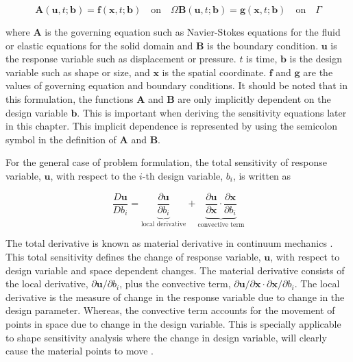 \begin{subequations}\label{eq:C2_governingEquationAndBC}
\begin{equation}\label{eq:C2_generalGoverningEquation}
	\mathbf{A}(\mathbf{u}, t; \mathbf{b}) = \mathbf{f}(\mathbf{x}, t; \mathbf{b})
	\quad \text{on} \quad \Omega
\end{equation}
\begin{equation}\label{eq:C2_generalBoundaryCondition}
	\mathbf{B}(\mathbf{u}, t; \mathbf{b}) = \mathbf{g}(\mathbf{x}, t; \mathbf{b})	
	\quad \text{on} \quad \Gamma
\end{equation}
\end{subequations}

where $\mathbf{A}$ is the governing equation such as Navier-Stokes equations for the fluid or elastic equations for the solid domain and $\mathbf{B}$ is the boundary condition. $\mathbf{u}$ is the response variable such as displacement or pressure. $t$ is time, $\mathbf{b}$ is the design variable such as shape or size, and $\mathbf{x}$ is the spatial coordinate. $\mathbf{f}$ and $\mathbf{g}$ are the values of governing equation and boundary conditions. It should be noted that in this formulation, the functions $\mathbf{A}$ and $\mathbf{B}$ are only implicitly dependent on the design variable $\mathbf{b}$. This is important when deriving the sensitivity equations later in this chapter. This implicit dependence is represented by using the semicolon symbol in the definition of $\mathbf{A}$ and $\mathbf{B}$.

For the general case of problem formulation, the total sensitivity of response variable, $\mathbf{u}$, with respect to the $i$-th design variable, $b_i$, is written as

\begin{equation}\label{eq:C2_totalSensitivityDef}
	\frac{D \mathbf{u}}{D b_i} = 
	\underbrace{\frac{\partial \mathbf{u}}{\partial b_i}}_\text{local derivative} + 
	\underbrace{\frac{\partial \mathbf{u}}{\partial \mathbf{x}} \cdot
	\frac{\partial \mathbf{x}}{\partial b_i}}_\text{convective term}
\end{equation}

The total derivative is known as material derivative in continuum mechanics \cite{mase2009continuum}. This total sensitivity defines the change of response variable, $\mathbf{u}$, with respect to design variable and space dependent changes. The material derivative consists of the local derivative, $\partial \mathbf{u}/\partial b_i$, plus the convective term, $\partial \mathbf{u}/\partial \mathbf{x} \cdot \partial \mathbf{x}/\partial b_i$. The local derivative is the measure of change in the response variable due to change in the design parameter. Whereas, the convective term accounts for the movement of points in space due to change in the design variable. This is specially applicable to shape sensitivity analysis where the change in design variable, will clearly cause the material points to move \cite{cross2014local}.

